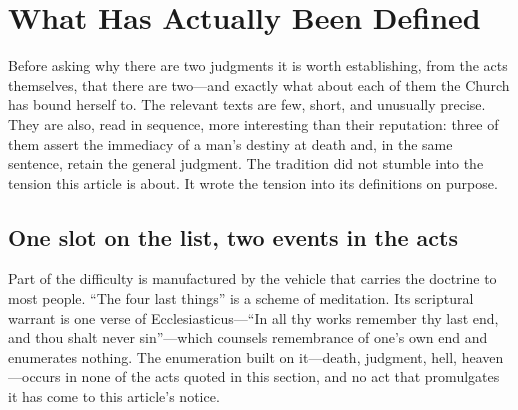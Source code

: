 \section{What Has Actually Been Defined}\label{sec:defined}

Before asking why there are two judgments it is worth establishing, from the acts themselves, that there are two---and exactly what about each of them the Church has bound herself to. The relevant texts are few, short, and unusually precise. They are also, read in sequence, more interesting than their reputation: three of them assert the immediacy of a man's destiny at death and, in the same sentence, retain the general judgment. The tradition did not stumble into the tension this article is about. It wrote the tension into its definitions on purpose.

\subsection{One slot on the list, two events in the acts}

Part of the difficulty is manufactured by the vehicle that carries the doctrine to most people. ``The four last things'' is a scheme of meditation. Its scriptural warrant is one verse of Ecclesiasticus---``In all thy works remember thy last end, and thou shalt never sin''---which counsels remembrance of one's own end and enumerates nothing. The enumeration built on it---death, judgment, hell, heaven---occurs in none of the acts quoted in this section, and no act that promulgates it has come to this article's notice.

